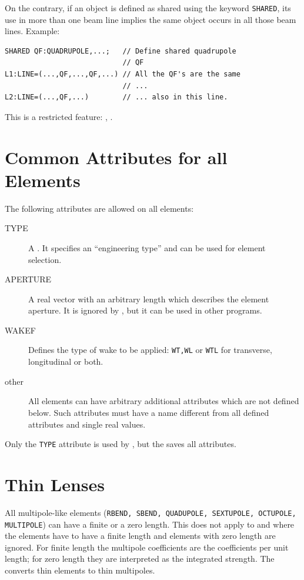 On the contrary, if an object is defined as shared using the keyword
\texttt{SHARED}, 
its use in more than one beam line implies the same object occurs
in all those beam lines.
Example:
\begin{verbatim}
SHARED QF:QUADRUPOLE,...;   // Define shared quadrupole 
                            // QF
L1:LINE=(...,QF,...,QF,...) // All the QF's are the same 
                            // ...
L2:LINE=(...,QF,...)        // ... also in this line.
\end{verbatim}
This is a restricted feature: \noopalt, \noopalcycl.

\section{Common Attributes for all Elements}
\label{sec:common}
The following attributes are allowed on all elements:
\begin{description}
\item[TYPE]
  A .
  It specifies an ``engineering type'' and can be used for element
  selection.
\item[APERTURE]
  A real vector with an arbitrary length which describes
  the element aperture.
  It is ignored by \opal, but it can be used in other programs.
\item[WAKEF]
Defines the type of wake to be applied: \texttt{WT,WL} or \texttt{WTL} for 
transverse, longitudinal or both.
\item[other]
  All elements can have arbitrary additional attributes
  which are not defined below.
  Such attributes must have a name different from all defined attributes
  and single real values.
\end{description}
Only the \texttt{TYPE} attribute is used by \opal,
but the  saves all attributes.

\section{Thin Lenses}
\label{sec:thin}
All multipole-like elements
(\texttt{RBEND, SBEND, QUADUPOLE, SEXTUPOLE, OCTUPOLE, MULTIPOLE})
can have a finite or a zero length. This does not apply to \opalt and \opalcycl where the elements have to have a finite length and elements with zero length are ignored.
For finite length the multipole coefficients are the coefficients per
unit length;
for zero length they are interpreted as the integrated strength.
The  converts thin elements to
thin multipoles.

